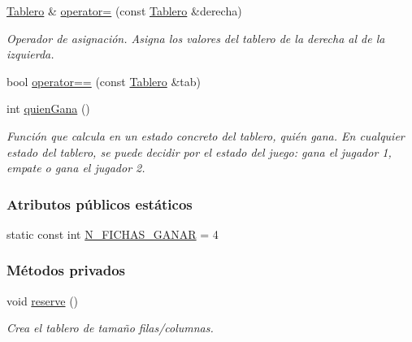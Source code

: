 \begin{DoxyCompactItemize}
\hyperlink{classTablero}{Tablero} \& \hyperlink{classTablero_abd7c6bb5bc26c0500308848399e1fd4f}{operator=} (const \hyperlink{classTablero}{Tablero} \&derecha)
\begin{DoxyCompactList}\small\item\em Operador de asignación. Asigna los valores del tablero de la derecha al de la izquierda. \end{DoxyCompactList}\item 
bool \hyperlink{classTablero_a4179e409e6aee35cb5c3dd55e4cac46b}{operator==} (const \hyperlink{classTablero}{Tablero} \&tab)
\item 
int \hyperlink{classTablero_a5de543f8186142731ab3ac77944a11b1}{quien\-Gana} ()
\begin{DoxyCompactList}\small\item\em Función que calcula en un estado concreto del tablero, quién gana. En cualquier estado del tablero, se puede decidir por el estado del juego\-: gana el jugador 1, empate o gana el jugador 2. \end{DoxyCompactList}\end{DoxyCompactItemize}
\subsubsection*{Atributos públicos estáticos}
\begin{DoxyCompactItemize}
\item 
static const int \hyperlink{classTablero_aa38ed353bef45bd6c5a2e3aa4a897720}{N\-\_\-\-F\-I\-C\-H\-A\-S\-\_\-\-G\-A\-N\-A\-R} = 4
\end{DoxyCompactItemize}
\subsubsection*{Métodos privados}
\begin{DoxyCompactItemize}
\item 
void \hyperlink{classTablero_ac2a20883f540c4d010dafab236390cb3}{reserve} ()
\begin{DoxyCompactList}\small\item\em Crea el tablero de tamaño filas/columnas. \end{DoxyCompactList}\end{DoxyCompactItemize}

